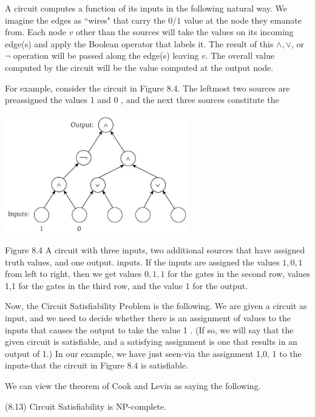 \documentclass[a4paper, 12pt]{book}
\theoremstyle{dotless}
\begin{document}
A circuit computes a function of its inputs in the following natural way. We imagine the edges as ``wires" that carry the $0 / 1$ value at the node they emanate from. Each node $v$ other than the sources will take the values on its incoming edge(s) and apply the Boolean operator that labels it. The result of this $\wedge, \vee$, or $\neg$ operation will be passed along the edge(s) leaving $v$. The overall value computed by the circuit will be the value computed at the output node.

For example, consider the circuit in Figure 8.4. The leftmost two sources are preassigned the values 1 and 0 , and the next three sources constitute the

\begin{center}
\includegraphics[width=0.6\textwidth]{2023_01_31_a1ea3121d626c5d81538g-17}
\end{center}

Figure 8.4 A circuit with three inputs, two additional sources that have assigned truth values, and one output. inputs. If the inputs are assigned the values $1,0,1$ from left to right, then we get values $0,1,1$ for the gates in the second row, values 1,1 for the gates in the third row, and the value 1 for the output.

Now, the Circuit Satisfiability Problem is the following. We are given a circuit as input, and we need to decide whether there is an assignment of values to the inputs that causes the output to take the value 1 . (If so, we will say that the given circuit is satisfiable, and a satisfying assignment is one that results in an output of 1.) In our example, we have just seen-via the assignment 1,0, 1 to the inputs-that the circuit in Figure $8.4$ is satisfiable.

We can view the theorem of Cook and Levin as saying the following.

(8.13) Circuit Satisfiability is NP-complete.
\end{document}
